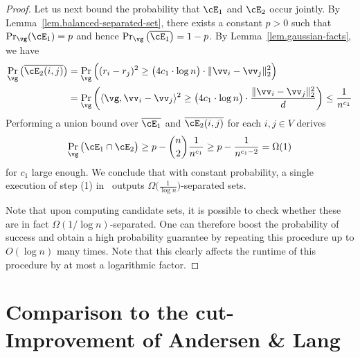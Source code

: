 \documentclass[letterpaper]{article}
\begin{document}
\begin{proof}
Let us next bound the probability that $\cE_1$ and $\cE_2$ occur jointly. By Lemma~\ref{lem.balanced-separated-set}, there exists a constant $p > 0$ such that $\Pr_{\vg}(\cE_1) = p$ and hence $\Pr_{\vg}\big( \overline{\cE_1} \big) = 1 - p$. By Lemma~\ref{lem.gaussian-facts}, we have
\begin{align*}
\Pr_{\vg} \big( \overline{\cE_2(i,j)} \big)
&= \Pr_{\vg} \Big( (r_i - r_j)^2 \geq \big( 4 c_1 \cdot \log n \big) \cdot \lVert \vv_i - \vv_j \rVert_2^2 \Big) \\
&= \Pr_{\vg} \bigg( \langle \vg, \vv_i - \vv_j \rangle^2 \geq \big( 4 c_1 \cdot \log n \big) \cdot \frac{\lVert \vv_i - \vv_j \rVert_2^2}{d} \bigg)
\leq \frac{1}{n^{c_1}}
\end{align*}
Performing a union bound over $\overline{\cE_1}$ and $\overline{\cE_{2}(i,j)}$ for each $i, j \in V$ derives
\begin{equation*}
\Pr_{\vg} \big( \cE_1 \cap \cE_2 \big)
\geq p - \binom{n}{2} \frac{1}{n^{c_1}}
\geq p - \frac{1}{n^{c_1 - 2}}
= \Omega(1)
\end{equation*}
for $c_1$ large enough. We conclude that with constant probability, a single execution of step (1) in \roundcut~outputs $\Omega \big( \frac{1}{\log n} \big)$-separated sets.

Note that upon computing candidate sets, it is possible to check whether these are in fact $\Omega(1/\log n)$-separated. One can therefore boost the probability of success and obtain a high probability guarantee by repeating this procedure up to $O(\log n)$ many times. Note that this clearly affects the runtime of this procedure by at most a logarithmic factor.
\end{proof}  \section{Comparison to the cut-Improvement of Andersen \& Lang}
\label{sec.appendix.andersen-lang}
\end{document}
